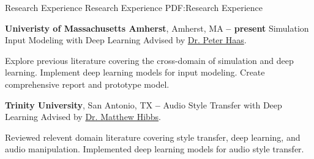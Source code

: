 \Section
{Research Experience}
{Research Experience}
{PDF:Research Experience}

\Entry
\textbf{Univeristy of Massachusetts Amherst},
Amherst, MA
\dotfill
\textbf{ -- present}
\SubEntry
\Gap
Simulation Input Modeling with Deep Learning
\Gap
Advised by \href{https://people.cs.umass.edu/~phaas/}{Dr. Peter Haas}.
\begin{Detail}
    \SubBulletItem
    Explore previous literature covering the cross-domain of simulation and deep learning.
    \SubBulletItem
    Implement deep learning models for input modeling.
    \SubBulletItem
    Create comprehensive report and prototype model.
\end{Detail}

\BigGap
\Entry
\textbf{Trinity University},
San Antonio, TX
\dotfill
\textbf{ -- }
\SubEntry
\Gap
Audio Style Transfer with Deep Learning
\Gap
Advised by \href{http://www.cs.trinity.edu/~mhibbs/}{Dr. Matthew Hibbs}.
\begin{Detail}
    \SubBulletItem
    Reviewed relevent domain literature covering style transfer, deep learning, and audio manipulation.
    \SubBulletItem
    Implemented deep learning models for audio style transfer.
\end{Detail}
